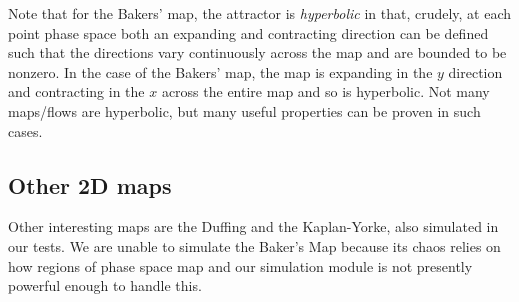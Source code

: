 \documentclass[10pt]{article}
\begin{document}
Note that for the Bakers' map, the attractor is \emph{hyperbolic} in that,
crudely, at each point phase space both an expanding and contracting direction
can be defined such that the directions vary continuously across the map and are
bounded to be nonzero. In the case of the Bakers' map, the map is expanding in
the $y$ direction and contracting in the $x$ across the entire map and so is
hyperbolic. Not many maps/flows are hyperbolic, but many useful properties can
be proven in such cases.

\subsection{Other 2D maps}

Other interesting maps are the Duffing and the Kaplan-Yorke, also simulated in
our tests. We are unable to simulate the Baker's Map because its chaos relies on
how regions of phase space map and our simulation module is not presently
powerful enough to handle this.
\end{document}
